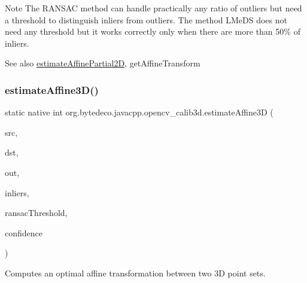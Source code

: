 \begin{DoxyNote}{Note}
The R\+A\+N\+S\+AC method can handle practically any ratio of outliers but need a threshold to distinguish inliers from outliers. The method L\+Me\+DS does not need any threshold but it works correctly only when there are more than 50\% of inliers. 
\end{DoxyNote}
\begin{DoxySeeAlso}{See also}
\hyperlink{group__calib3d_gab4e1d79cab0ae6448de411f9688836c8}{estimate\+Affine\+Partial2D}, get\+Affine\+Transform 
\end{DoxySeeAlso}
\mbox{\label{group__calib3d_ga07eb86fa8ee181d1695f57b6b93955cd}} 
\subsubsection{\texorpdfstring{estimate\+Affine3\+D()}{estimateAffine3D()}}
{\footnotesize\ttfamily static native int org.\+bytedeco.\+javacpp.\+opencv\+\_\+calib3d.\+estimate\+Affine3D (\begin{DoxyParamCaption}\item[{@By\+Val Mat}]{src,  }\item[{@By\+Val Mat}]{dst,  }\item[{@By\+Val Mat}]{out,  }\item[{@By\+Val Mat}]{inliers,  }\item[{double}]{ransac\+Threshold,  }\item[{double}]{confidence }\end{DoxyParamCaption})\hspace{0.3cm}{\ttfamily [static]}}



Computes an optimal affine transformation between two 3D point sets. 


